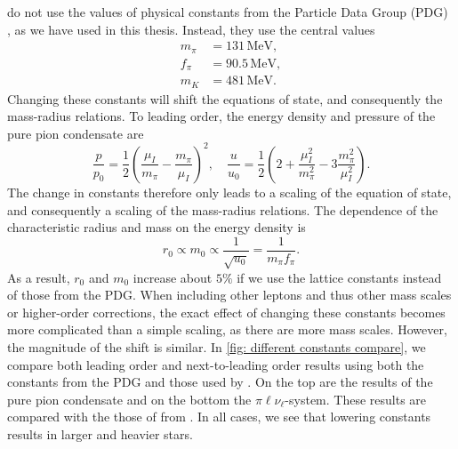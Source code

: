 \citeauthor{brandtNewClassCompact2018} do not use the values of physical constants from the Particle Data Group (PDG) \autocite{particledatagroupReviewParticlePhysics2020}, as we have used in this thesis.
Instead, they use the central values~\autocite{adhikariQuarkPionAxial2021}
%
\begin{align}
    m_\pi &= 131\,\text{MeV},\\
    f_\pi &= 90.5\,\text{MeV},\\
    m_K &= 481\,\text{MeV}.
\end{align}
%
Changing these constants will shift the equations of state, and consequently the mass-radius relations.
To leading order, the energy density and pressure of the pure pion condensate are
%
\begin{equation}
    \frac{p}{p_0} = \frac{1}{2} \left(\frac{\mu_I}{m_\pi} - \frac{m_\pi}{\mu_I}\right)^2,
    \quad
    \frac{u}{u_0}
    = \frac{1}{2} \left(2 + \frac{\mu_I^2}{m_\pi^2} - 3\frac{m_\pi^2}{\mu_I^2}\right).
\end{equation}
%
The change in constants therefore only leads to a scaling of the equation of state, and consequently a scaling of the mass-radius relations.
The dependence of the characteristic radius and mass on the energy density is
%
\begin{equation}
    r_0 \propto m_0 \propto \frac{1}{\sqrt{u_0}} = \frac{1}{m_\pi f_\pi}.
\end{equation}
%
As a result, $r_0$ and $m_0$ increase about $5\%$ if we use the lattice constants instead of those from the PDG.
When including other leptons and thus other mass scales or higher-order corrections, the exact effect of changing these constants becomes more complicated than a simple scaling, as there are more mass scales.
However, the magnitude of the shift is similar.
In \autoref{fig: different constants compare}, we compare both leading order and next-to-leading order results using both the constants from the PDG and those used by \citeauthor{brandtNewClassCompact2018}.
On the top are the results of the pure pion condensate and on the bottom the $\pi\ell\nu_\ell$-system.
These results are compared with the those of \citeauthor{brandtNewClassCompact2018} from \autocite{brandtNewClassCompact2018}.
In all cases, we see that lowering constants results in larger and heavier stars.

